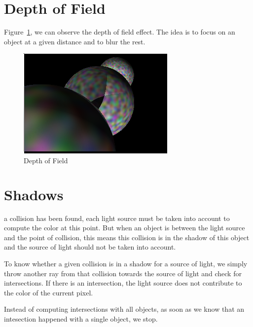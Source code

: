 \documentclass[a4paper,12pt,journal,twoside,compsoc]{PPIEEEtran}
\begin{document}
\section{Depth of Field}
 Figure~\ref{fig:dof}, we can observe the depth of field effect. The idea
is to focus on an object at a given distance and to blur the rest.

\begin{figure}
  \begin{center}
    \includegraphics[width=0.7\linewidth]{dof.png}
  \end{center}
  \caption{Depth of Field}
  \label{fig:dof}
\end{figure}

\section{Shadows}
a collision has been found, each light source must be taken into account to
compute the color at this point.  But when an object is between the light source
and the point of collision, this means this collision is in the shadow of this
object and the source of light should not be taken into account.

To know whether a given collision is in a shadow for a source of light, we
simply throw another ray from that collision towards the source of light and
check for intersections.  If there is an intersection, the light source does not
contribute to the color of the current pixel.

\indent Instead of computing intersections with all objects, as soon as we
know that an intesection happened with a single object, we stop.

\end{document}
